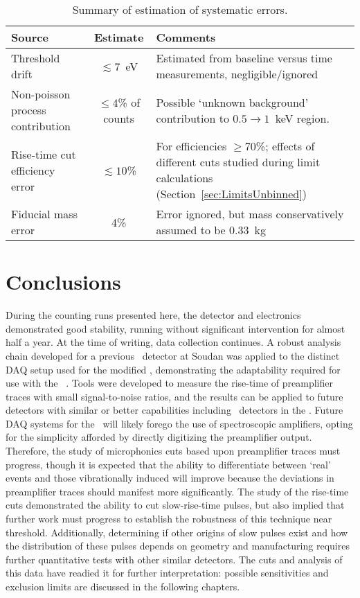 			\begin{table} 
				\centering
				\begin{tabular}{p{}  c  p{}  } 
				\toprule
					Source & Estimate & Comments \\
				\midrule	
					Threshold drift & $\lesssim7$~eV & Estimated from baseline versus time measurements, negligible/ignored \\
					Non-poisson process contribution & $\leq4$\% of counts & Possible `unknown background' contribution to $0.5\to1$~keV region.  \\			
					Rise-time cut efficiency error & $\lesssim10$\% & For efficiencies $\geq$70\%; effects of different cuts studied during limit calculations (Section~\ref{sec:LimitsUnbinned}) \\
					Fiducial mass error & 4\% & Error ignored, but mass conservatively assumed to be 0.33~kg\\

				\bottomrule
				\end{tabular}	
				\caption{Summary of estimation of systematic errors.}
				\label{tab:BeGeSysErrors}
			\end{table}
	\section{Conclusions}
     	\label{sec:BeGeConclusions}		
	
	During the counting runs presented here, the detector and electronics demonstrated good stability, running without significant intervention for almost half a year.  At the time of writing, data collection continues.  A robust analysis chain developed for a previous \ppc~detector at Soudan was applied to the distinct DAQ setup used for the modified \bege, demonstrating the adaptability required for use with the \MJ~\minmod.  Tools were developed to measure the rise-time of preamplifier traces with small signal-to-noise ratios, and the results can be applied to future detectors with similar or better capabilities including \ppc~detectors in the \minmod.  Future DAQ systems for the \minmod~will likely forego the use of spectroscopic amplifiers, opting for the simplicity afforded by directly digitizing the preamplifier output.  Therefore, the study of microphonics cuts based upon preamplifier traces must progress, though it is expected that the ability to differentiate between `real' events and those vibrationally induced will improve because the deviations in preamplifier traces should manifest more significantly.  The study of the rise-time cuts demonstrated the ability to cut slow-rise-time pulses, but also implied that further work must progress to establish the robustness of this technique near threshold.  Additionally, determining if other origins of slow pulses exist and how the distribution of these pulses depends on geometry and manufacturing requires further quantitative tests with other similar detectors.  The cuts and analysis of this data have readied it for further interpretation: possible sensitivities and exclusion limits are discussed in the following chapters.
